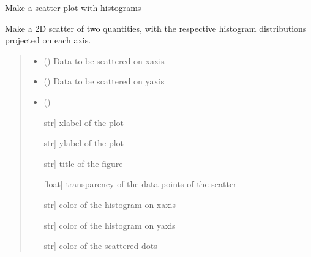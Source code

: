 \documentclass[letterpaper,10pt,english]{sphinxmanual}
\begin{document}
\begin{fulllineitems}
\label{\detokenize{plots:ggcas.plots.scatter_2hist}}
\pysigstartsignatures
{}
\pysigstopsignatures
\sphinxAtStartPar
Make a scatter plot with histograms

\sphinxAtStartPar
Make a 2D scatter of two quantities, with the respective histogram distributions projected on each axis.
\begin{quote}\begin{description}
\begin{itemize}
\item {} 
\sphinxAtStartPar
{} () \textendash{} Data to be scattered on x\sphinxhyphen{}axis

\item {} 
\sphinxAtStartPar
{} () \textendash{} Data to be scattered on y\sphinxhyphen{}axis

\item {} 
\sphinxAtStartPar
{} () \textendash{} \begin{description}
\sphinxlineitem{xlabel}{[}str{]}
\sphinxAtStartPar
xlabel of the plot

\sphinxlineitem{ylabel}{[}str{]}
\sphinxAtStartPar
ylabel of the plot

\sphinxlineitem{title}{[}str{]}
\sphinxAtStartPar
title of the figure

\sphinxlineitem{alpha}{[}float{]}
\sphinxAtStartPar
transparency of the data points of the scatter

\sphinxlineitem{colorx}{[}str{]}
\sphinxAtStartPar
color of the histogram on x\sphinxhyphen{}axis

\sphinxlineitem{colory}{[}str{]}
\sphinxAtStartPar
color of the histogram on y\sphinxhyphen{}axis

\sphinxlineitem{scatter\_color}{[}str{]}
\sphinxAtStartPar
color of the scattered dots

\end{description}


\end{itemize}

\end{description}\end{quote}

\end{fulllineitems}
\end{document}
